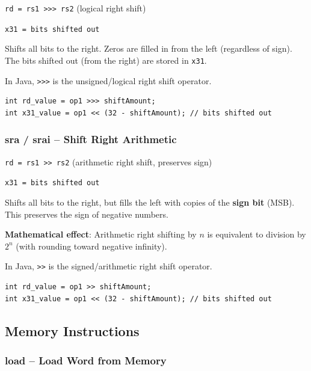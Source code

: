 \documentclass[12pt,a4paper]{article}
\begin{document}
\begin{tcolorbox}[colback=orange!5, colframe=orange!50!black]
\texttt{rd = rs1 >>> rs2} (logical right shift)

\texttt{x31 = bits shifted out}
\end{tcolorbox}

Shifts all bits to the right. Zeros are filled in from the left (regardless of sign). The bits shifted out (from the right) are stored in \texttt{x31}.

In Java, \texttt{>>>} is the unsigned/logical right shift operator.

\begin{lstlisting}[style=javastyle]
int rd_value = op1 >>> shiftAmount;
int x31_value = op1 << (32 - shiftAmount); // bits shifted out
\end{lstlisting}

\subsubsection{sra / srai -- Shift Right Arithmetic}

\begin{tcolorbox}[colback=orange!5, colframe=orange!50!black]
\texttt{rd = rs1 >> rs2} (arithmetic right shift, preserves sign)

\texttt{x31 = bits shifted out}
\end{tcolorbox}

Shifts all bits to the right, but fills the left with copies of the \textbf{sign bit} (MSB). This preserves the sign of negative numbers.

\textbf{Mathematical effect}: Arithmetic right shifting by $n$ is equivalent to division by $2^n$ (with rounding toward negative infinity).

In Java, \texttt{>>} is the signed/arithmetic right shift operator.

\begin{lstlisting}[style=javastyle]
int rd_value = op1 >> shiftAmount;
int x31_value = op1 << (32 - shiftAmount); // bits shifted out
\end{lstlisting}

\subsection{Memory Instructions}

\subsubsection{load -- Load Word from Memory}
\end{document}
